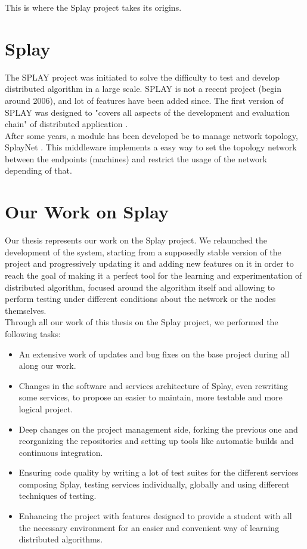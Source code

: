 \documentclass{eplmastersthesis}
\begin{document}
      This is where the Splay project takes its origins.

    \section{Splay}

      The SPLAY project was initiated to solve the difficulty to test and
      develop distributed algorithm in a large scale. SPLAY is not a recent
      project (begin around 2006), and lot of features have been added since.
      The first version of SPLAY was designed to "covers all aspects of the
      development and evaluation chain" of distributed application
      \cite{SPLAY}. \\

      After some years, a module has been developed be to manage network
      topology, SplayNet \cite{SplayNet}. This middleware implements a easy
      way to set the topology network between the endpoints (machines) and
      restrict the usage of the network depending of that.


    \section{Our Work on Splay}

      Our thesis represents our work on the Splay project. We relaunched
      the development of the system, starting from a supposedly stable
      version of the project and progressively updating it and adding new
      features on it in order to reach the goal of making it a perfect
      tool for the learning and experimentation of distributed algorithm,
      focused around the algorithm itself and allowing to perform testing
      under different conditions about the network or the nodes themselves.\\

      Through all our work of this thesis on the Splay project, we performed
      the following tasks:

      \begin{itemize}
        \item An extensive work of updates and bug fixes on the base project
        during all along our work.
        \item Changes in the software and services architecture of Splay,
        even rewriting some services, to propose an easier to maintain, more
        testable and more logical project.
        \item Deep changes on the project management side, forking the
        previous one and reorganizing the repositories and setting up tools
        like automatic builds and continuous integration.
        \item Ensuring code quality by writing a lot of test suites for the
        different services composing Splay, testing services individually,
        globally and using different techniques of testing.
        \item Enhancing the project with features designed to provide a
        student with all the necessary environment for an easier and convenient
        way of learning distributed algorithms.
      \end{itemize}
\end{document}
